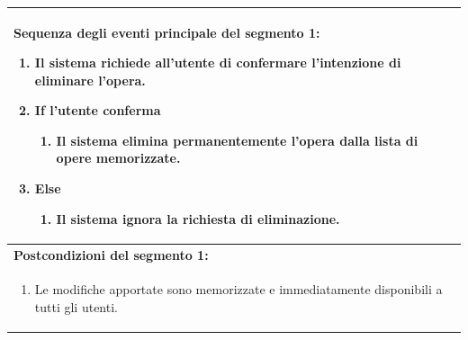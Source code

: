 \documentclass{article}
\begin{document}
\begin{table}[H]
\begin{tabular}{|p{\linewidth}|}
                        \hline
                        \textbf{Sequenza degli eventi principale del segmento 1:}
                        \begin{enumerate}
                            \item Il sistema richiede all'utente di confermare l'intenzione di eliminare l'opera.
                            \item \textbf{If} l'utente conferma
                                \begin{enumerate}
                                    \item Il sistema elimina permanentemente l'opera dalla lista di opere memorizzate.
                                \end{enumerate}
                            \item \textbf{Else}
                                \begin{enumerate}
                                    \item Il sistema ignora la richiesta di eliminazione.
                                \end{enumerate}
                        \end{enumerate} \\
                        \hline
                        \cellcolor{gray!20}
                        \textbf{Postcondizioni del segmento 1:} \\
                        \cellcolor{gray!20}
                        \begin{minipage}{\linewidth}
                            \begin{enumerate}
                                \item Le modifiche apportate sono memorizzate e immediatamente disponibili a tutti gli utenti.
                            \end{enumerate}
                        \end{minipage} \\
                        \hline
                    \end{tabular}
                \end{table}
\end{document}
